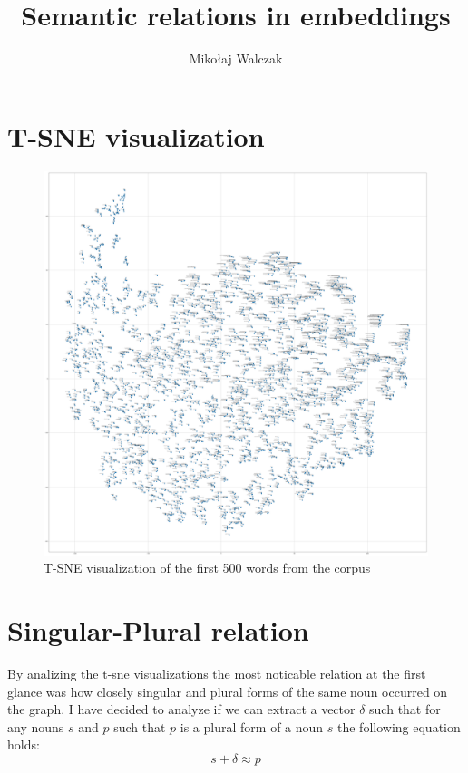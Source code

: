 \documentclass{article}
\author{Mikołaj Walczak}
\title{Semantic relations in embeddings}
\begin{document}
  \maketitle
  \section{T-SNE visualization}
  \begin{figure}[ht]
    \includegraphics[width=\textwidth]{embeddings_500}
    \caption{T-SNE visualization of the first 500 words from the corpus}
    \label{fig:tsne-500}
  \end{figure}

  \section{Singular-Plural relation}
  By analizing the t-sne visualizations the most noticable relation at the first
  glance was how closely singular and plural forms of the same noun occurred on
  the graph. I have decided to analyze if we can extract a vector $\delta$ such that
  for any nouns $s$ and $p$ such that $p$ is a plural form of a noun $s$ the
  following equation holds:
  \begin{equation}
    s + \delta \approx p
  \end{equation}
\end{document}
